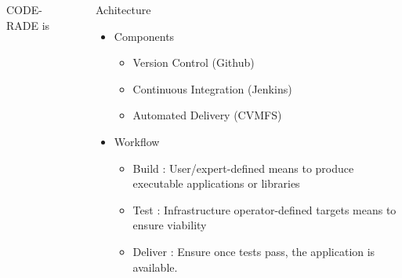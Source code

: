 \documentclass[final]{beamer}
\newlength{\sepwid}
\newlength{\onecolwid}
\begin{document}
\begin{frame}[t]
\begin{columns}[t]
\begin{column}{\onecolwid}
\begin{block}{CODE-RADE is }
         \end{block}
    \end{column}
    \begin{column}{\sepwid}\end{column}			%
    \begin{column}{\onecolwid}
         \begin{block}{Achitecture}
             \begin{itemize}
                     \item Components
                           \begin{itemize}
                               \item Version Control (Github)
                               \item Continuous Integration (Jenkins)
                               \item Automated Delivery (CVMFS)
                           \end{itemize}
                     \item Workflow 
                         \begin{itemize}
                                 \item Build : User/expert-defined means to produce executable applications or libraries
                                 \item Test : Infrastructure operator-defined targets means to ensure viability
                                 \item Deliver : Ensure once tests pass, the application is available.
                         \end{itemize}
             \end{itemize}


\end{block}
\end{column}
\end{columns}
\end{frame}
\end{document}
